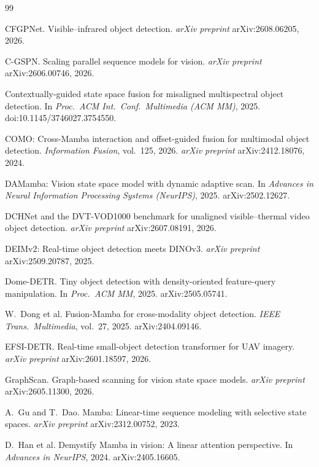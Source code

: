 \begin{thebibliography}{99}

CFGPNet. Visible--infrared object detection.
\textit{arXiv preprint} arXiv:2608.06205, 2026.

C-GSPN. Scaling parallel sequence models for vision.
\textit{arXiv preprint} arXiv:2606.00746, 2026.

Contextually-guided state space fusion for misaligned multispectral object
detection. In \textit{Proc.\ ACM Int.\ Conf.\ Multimedia (ACM MM)}, 2025.
doi:10.1145/3746027.3754550.

COMO: Cross-Mamba interaction and offset-guided fusion for multimodal object
detection. \textit{Information Fusion}, vol.~125, 2026.
\textit{arXiv preprint} arXiv:2412.18076, 2024.

DAMamba: Vision state space model with dynamic adaptive scan.
In \textit{Advances in Neural Information Processing Systems (NeurIPS)}, 2025.
arXiv:2502.12627.

DCHNet and the DVT-VOD1000 benchmark for unaligned visible--thermal video
object detection. \textit{arXiv preprint} arXiv:2607.08191, 2026.

DEIMv2: Real-time object detection meets DINOv3.
\textit{arXiv preprint} arXiv:2509.20787, 2025.

Dome-DETR. Tiny object detection with density-oriented feature-query
manipulation. In \textit{Proc.\ ACM MM}, 2025. arXiv:2505.05741.

W.~Dong et al.
Fusion-Mamba for cross-modality object detection.
\textit{IEEE Trans.\ Multimedia}, vol.~27, 2025. arXiv:2404.09146.

EFSI-DETR. Real-time small-object detection transformer for UAV imagery.
\textit{arXiv preprint} arXiv:2601.18597, 2026.

GraphScan. Graph-based scanning for vision state space models.
\textit{arXiv preprint} arXiv:2605.11300, 2026.

A.~Gu and T.~Dao.
Mamba: Linear-time sequence modeling with selective state spaces.
\textit{arXiv preprint} arXiv:2312.00752, 2023.

D.~Han et al.
Demystify Mamba in vision: A linear attention perspective.
In \textit{Advances in NeurIPS}, 2024. arXiv:2405.16605.


\end{thebibliography}
